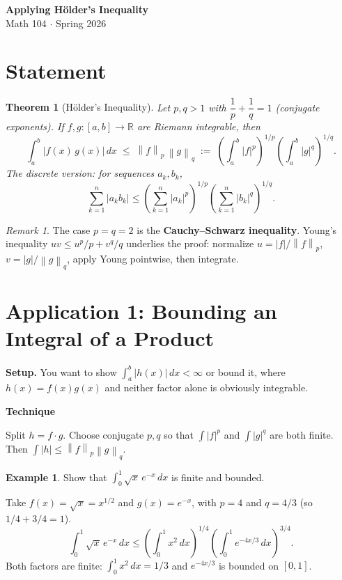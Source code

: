 \documentclass[11pt]{article}
\newcommand{\R}{\mathbb{R}}
\newcommand{\norm}[2]{\left\|#1\right\|_{#2}}
\theoremstyle{myplain}
\newtheorem*{theorem*}{Theorem}
\theoremstyle{definition}
\newtheorem{example}{Example}
\theoremstyle{remark}
\newtheorem*{remark}{Remark}
\newenvironment{technique}{%
  \par\smallskip
  \noindent\colorbox{Apricot}{\textbf{Technique}}\enspace\ignorespaces
}{\par\smallskip}
\begin{document}
\begin{center}
  {\LARGE\bfseries Applying H\"{o}lder's Inequality}\\[4pt]
  {\large Math 104 $\cdot$ Spring 2026}
\end{center}

\bigskip

\section{Statement}

\begin{theorem*}[H\"{o}lder's Inequality]
Let $p, q > 1$ with $\dfrac{1}{p} + \dfrac{1}{q} = 1$ (conjugate exponents). If $f, g : [a,b] \to \R$ are Riemann integrable, then
\[
  \int_a^b |f(x)\,g(x)|\,dx \;\leq\; \norm{f}{p}\,\norm{g}{q}
  \;:=\; \left(\int_a^b |f|^p\right)^{1/p}\!\left(\int_a^b |g|^q\right)^{1/q}.
\]
The discrete version: for sequences $a_k, b_k$,
\[
  \sum_{k=1}^n |a_k b_k| \leq \left(\sum_{k=1}^n |a_k|^p\right)^{1/p}\!\left(\sum_{k=1}^n |b_k|^q\right)^{1/q}.
\]
\end{theorem*}

\begin{remark}
The case $p = q = 2$ is the \textbf{Cauchy--Schwarz inequality}. Young's inequality $uv \leq u^p/p + v^q/q$ underlies the proof: normalize $u = |f|/\norm{f}{p}$, $v = |g|/\norm{g}{q}$, apply Young pointwise, then integrate.
\end{remark}

\section{Application 1: Bounding an Integral of a Product}

\textbf{Setup.} You want to show $\int_a^b |h(x)|\,dx < \infty$ or bound it, where $h(x) = f(x)g(x)$ and neither factor alone is obviously integrable.

\begin{technique}
Split $h = f \cdot g$. Choose conjugate $p,q$ so that $\int |f|^p$ and $\int |g|^q$ are both finite. Then $\int|h| \leq \norm{f}{p}\norm{g}{q}$.
\end{technique}

\begin{example}
Show that $\displaystyle\int_0^1 \sqrt{x}\,e^{-x}\,dx$ is finite and bounded.

Take $f(x) = \sqrt{x} = x^{1/2}$ and $g(x) = e^{-x}$, with $p = 4$ and $q = 4/3$ (so $1/4 + 3/4 = 1$).
\[
  \int_0^1 \sqrt{x}\,e^{-x}\,dx \leq \left(\int_0^1 x^2\,dx\right)^{1/4}\!\left(\int_0^1 e^{-4x/3}\,dx\right)^{3/4}.
\]
Both factors are finite: $\int_0^1 x^2\,dx = 1/3$ and $e^{-4x/3}$ is bounded on $[0,1]$.
\end{example}
\end{document}
